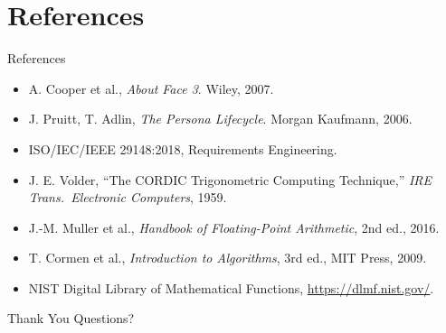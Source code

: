\documentclass[10pt]{beamer}
\begin{document}
\section{References}
\begin{frame}{References}
  \small
  \begin{itemize}
    \item A. Cooper et al., \emph{About Face 3}. Wiley, 2007.
    \item J. Pruitt, T. Adlin, \emph{The Persona Lifecycle}. Morgan Kaufmann, 2006.
    \item ISO/IEC/IEEE 29148:2018, Requirements Engineering.
    \item J. E. Volder, ``The CORDIC Trigonometric Computing Technique,'' \emph{IRE Trans.\ Electronic Computers}, 1959.
    \item J.-M. Muller et al., \emph{Handbook of Floating-Point Arithmetic}, 2nd ed., 2016.
    \item T. Cormen et al., \emph{Introduction to Algorithms}, 3rd ed., MIT Press, 2009.
    \item NIST Digital Library of Mathematical Functions, \url{https://dlmf.nist.gov/}.
  \end{itemize}
\end{frame}

\begin{frame}{Thank You}
  \centering
  \Large Questions?
\end{frame}
\end{document}
